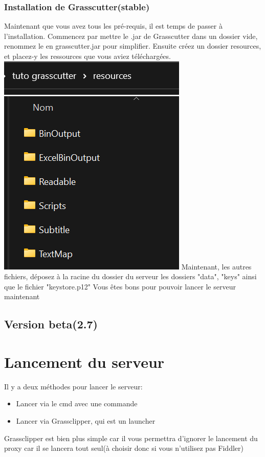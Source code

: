 \documentclass{article}
\begin{document}
\subsubsection{Installation de Grasscutter(stable)}
Maintenant que vous avez tous les pré-requis, il est temps de passer à l'installation.\newline
Commencez par mettre le .jar de Grasscutter dans un dossier vide, renommez le en grasscutter.jar pour simplifier.\newline
Ensuite créez un dossier resources, et placez-y les ressources que vous aviez téléchargées.\newline
\includegraphics[scale=1]{img/disp_resources.png}\newline
Maintenant, les autres fichiers, déposez à la racine du dossier du serveur les dossiers "data", "keys" ainsi que le fichier "keystore.p12"\newline
Vous êtes bons pour pouvoir lancer le serveur maintenant

\subsection{Version beta(2.7)}

\section{Lancement du serveur}
Il y a deux méthodes pour lancer le serveur:
\begin{itemize}
	\item Lancer via le cmd avec une commande
	\item Lancer via Grassclipper, qui est un launcher
\end{itemize}
Grassclipper est bien plus simple car il vous permettra d'ignorer le lancement du proxy car il se lancera tout seul(à choisir donc si vous n'utilisez pas Fiddler)
\end{document}

